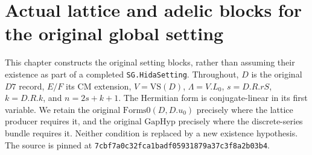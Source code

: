 \section{Actual lattice and adelic blocks for the original global setting}
\label{sec:adelic-setting-v47}

This chapter constructs the original setting blocks, rather than assuming
their existence as part of a completed \texttt{SG.HidaSetting}.
Throughout, \(D\) is the original \(D7\) record, \(E/F\) its CM
extension, \(V=\mathrm{VS}(D)\), \(\Lambda=V.L_0\),
\(s=D.R.rS\), \(k=D.R.k\), and \(n=2s+k+1\).
The Hermitian form is conjugate-linear in its first variable.
We retain the original \(\mathrm{Forms0}(D,D.u_0)\) precisely where
the lattice producer requires it, and the original \(\mathrm{GapHyp}\)
precisely where the discrete-series bundle requires it.
Neither condition is replaced by a new existence hypothesis.
The source is pinned at
\texttt{7cbf7a0c32fca1badf05931879a37c3f8a2b03b4}.

